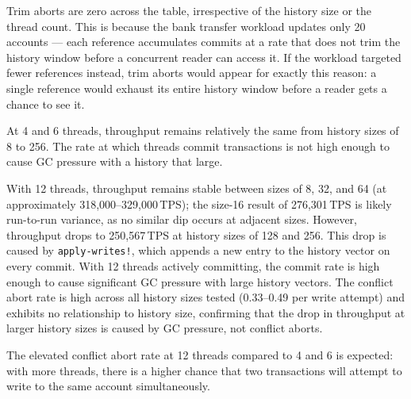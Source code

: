 Trim aborts are zero across the table, irrespective of the history size
or the thread count. This is because the bank transfer workload updates
only 20 accounts --- each reference accumulates commits at a rate that
does not trim the history window before a concurrent reader
can access it. If the workload targeted fewer references instead, trim
aborts would appear for exactly this reason: a single reference would
exhaust its entire history window before a reader gets a chance to see it.

At 4 and 6 threads, throughput remains relatively the same from history
sizes of 8 to 256. The rate at which threads commit transactions is not
high enough to cause GC pressure with a history that large.

With 12 threads, throughput remains stable between sizes of 8, 32, and
64 (at approximately 318,000--329,000\,TPS); the size-16 result of
276,301\,TPS is likely run-to-run variance, as no similar dip occurs at
adjacent sizes. However, throughput drops to 250,567\,TPS at history
sizes of 128 and 256. This drop is caused by \texttt{apply-writes!},
which appends a new entry to the history vector on every commit. With 12
threads actively committing, the commit rate is high enough to cause
significant GC pressure with large history vectors. The conflict abort
rate is high across all history sizes tested (0.33--0.49 per write
attempt) and exhibits no relationship to history size, confirming that
the drop in throughput at larger history sizes is caused by GC pressure,
not conflict aborts.

The elevated conflict abort rate at 12 threads compared to 4 and 6 is
expected: with more threads, there is a higher chance that two
transactions will attempt to write to the same account simultaneously.

